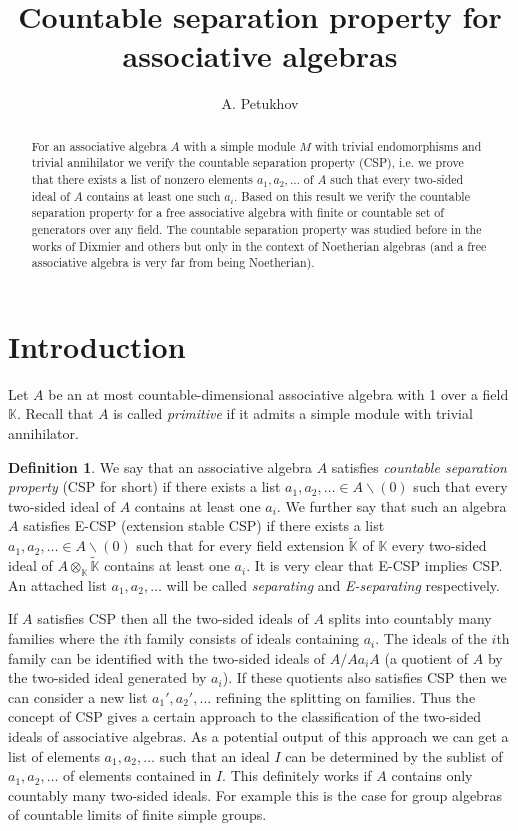 \documentclass{amsart} \textwidth=18.0cm \oddsidemargin=-1cm \evensidemargin=-1cm \topmargin=-1cm \textheight=23cm
\title{Countable separation property for associative algebras}
\author{A. Petukhov}
\theoremstyle{definition}
\newtheorem{definition}{Definition}
\begin{document}
\maketitle
\begin{abstract}
    For an associative algebra $A$ with a simple module $M$ with trivial endomorphisms and trivial annihilator we verify the countable separation property (CSP), i.e. we prove that there exists a list of nonzero elements $a_1, a_2,\ldots$ of $A$ such that every two-sided ideal of $A$ contains at least one such $a_i$. 
    Based on this result we verify the countable separation property for a free associative algebra with finite or countable set of generators over any field. 
    The countable separation property was studied before in the works of Dixmier and others but only in the context of Noetherian algebras (and a free associative algebra is very far from being Noetherian).
\end{abstract}
\section{Introduction}
Let $A$ be an at most countable-dimensional associative algebra with 1 over a field $\mathbb K$. Recall that $A$ is called {\it primitive} if it admits a simple module with trivial annihilator. 
\begin{definition}
    We say that an associative algebra $A$ satisfies {\it countable separation property} (CSP for short) if there exists a list $a_1, a_2,\ldots\in A\backslash(0)$ such that every two-sided ideal of $A$ contains at least one $a_i$. 
    We further say that such an algebra $A$ satisfies E-CSP (extension stable CSP) if there exists a list $a_1, a_2,\ldots\in A\backslash(0)$ such that for every field extension $\widetilde{\mathbb K}$ of $\mathbb K$ every two-sided ideal of $A\otimes_{\mathbb K}\widetilde{\mathbb K}$ contains at least one $a_i$. 
    It is very clear that E-CSP implies CSP. 
    An attached list $a_1, a_2, \ldots$ will be called {\it separating} and {\it E-separating} respectively. 
\end{definition}
If $A$ satisfies CSP then all the two-sided ideals of $A$ splits into countably many families where the  $i$th family consists of ideals containing $a_i$. 
The ideals of the $i$th family can be identified with the two-sided ideals of $A/Aa_iA$ (a quotient of $A$ by the two-sided ideal generated by $a_i$). If these quotients also satisfies CSP then we can consider a new list $a_1', a_2',\ldots$ refining the splitting on families. 
Thus the concept of CSP gives a certain approach to the classification of the two-sided ideals of associative algebras. 
As a potential output of this approach we can get a list of elements $a_1, a_2, \ldots$ such that an ideal $I$ can be determined by the sublist of $a_1, a_2, \ldots$ of elements contained in $I$.  
This definitely works if $A$ contains only countably many two-sided ideals. 
For example this is the case for group algebras of countable limits of finite simple groups.
\end{document}
